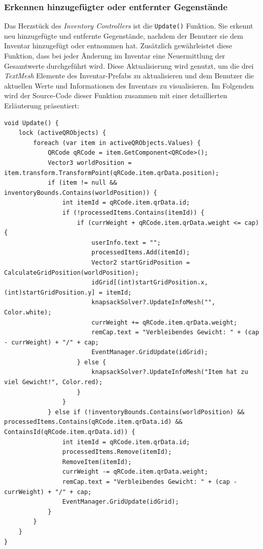 \subsubsection{\label{sec:moritsInventarBounds}Erkennen hinzugefügter oder entfernter Gegenstände}
Das Herzstück des \textit{Inventory Controllers} ist die \texttt{Update()} Funktion. Sie erkennt neu hinzugefügte und
entfernte Gegenstände, nachdem der Benutzer sie dem Inventar hinzugefügt oder entnommen hat. Zusätzlich gewährleistet
diese Funktion, dass bei jeder Änderung im Inventar eine Neuermittlung der Gesamtwerte durchgeführt wird. Diese Aktualisierung
wird genutzt, um die drei \textit{TextMesh} Elemente des Inventar-Prefabs zu aktualisieren und dem Benutzer die aktuellen
Werte und Informationen des Inventars zu visualisieren. Im Folgenden wird der Source-Code dieser Funktion zusammen mit
einer detaillierten Erläuterung präsentiert:
\begin{lstlisting}[style=csharp, caption={Neue / Entfernte Items erkennen}, label=code:controller_updateGrid]
void Update() {
    lock (activeQRObjects) {
        foreach (var item in activeQRObjects.Values) {
            QRCode qRCode = item.GetComponent<QRCode>();
            Vector3 worldPosition = item.transform.TransformPoint(qRCode.item.qrData.position);
            if (item != null && inventoryBounds.Contains(worldPosition)) {
                int itemId = qRCode.item.qrData.id;
                if (!processedItems.Contains(itemId)) {
                    if (currWeight + qRCode.item.qrData.weight <= cap) {
                        userInfo.text = "";
                        processedItems.Add(itemId);
                        Vector2 startGridPosition = CalculateGridPosition(worldPosition);
                        idGrid[(int)startGridPosition.x, (int)startGridPosition.y] = itemId;
                        knapsackSolver?.UpdateInfoMesh("", Color.white);
                        currWeight += qRCode.item.qrData.weight;
                        remCap.text = "Verbleibendes Gewicht: " + (cap - currWeight) + "/" + cap;
                        EventManager.GridUpdate(idGrid);
                    } else {
                        knapsackSolver?.UpdateInfoMesh("Item hat zu viel Gewicht!", Color.red);
                    }
                }
            } else if (!inventoryBounds.Contains(worldPosition) && processedItems.Contains(qRCode.item.qrData.id) && ContainsId(qRCode.item.qrData.id)) {
                int itemId = qRCode.item.qrData.id;
                processedItems.Remove(itemId);
                RemoveItem(itemId);
                currWeight -= qRCode.item.qrData.weight;
                remCap.text = "Verbleibendes Gewicht: " + (cap - currWeight) + "/" + cap;
                EventManager.GridUpdate(idGrid);
            }
        }
    }
}
\end{lstlisting}

